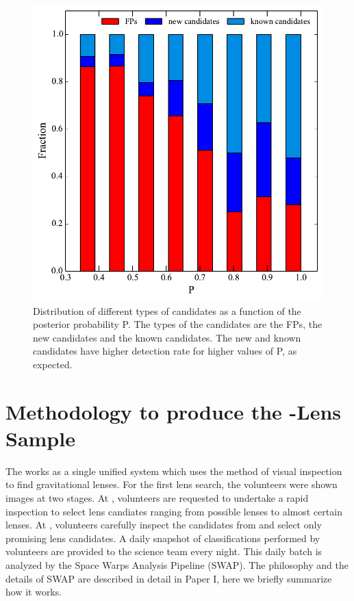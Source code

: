 \documentclass[useAMS,usenatbib,a4paper]{mn2e}
\begin{document}
\begin{figure}
\begin{center}
\includegraphics[scale=0.6]{sw-cfhtls-figs/cand_fp_P_frac.pdf}
\caption{ \label{fig:stackP}
Distribution of different types of candidates as a function of the posterior
probability P. The types of the candidates are the FPs, the new candidates and
the known candidates. The new and known candidates have higher detection rate
for higher values of P, as expected.}
\end{center}
\end{figure}


\section{Methodology to produce the \sw-\cfhtls Lens Sample}
\label{sec:swap}
The \sw works as a single unified system which uses the method of visual
inspection to find gravitational lenses. For the first \sw lens search,
the volunteers were shown images at two stages. At \StageOne, volunteers
are requested to undertake a rapid inspection to select lens candiates
ranging from possible lenses to almost certain lenses. At \StageTwo,
volunteers carefully inspect the candidates from \StageOne and select
only promising lens candidates. A daily snapshot of classifications
performed by volunteers are provided to the science team every night.
This daily batch is analyzed by the Space Warps Analysis Pipeline
(SWAP). The philosophy and the details of SWAP are described in detail
in Paper I, here we briefly summarize how it works.
\end{document}
